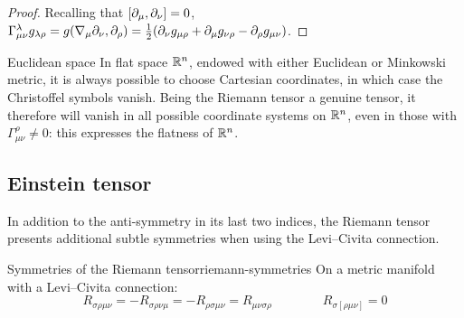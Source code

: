 \begin{proofbox}
  \begin{proof}
    Recalling that $ [\partial_\mu, \partial_\nu] = 0 $, $ \Gamma^\lambda_{\mu \nu} g_{\lambda \rho} = g(\nabla_\mu \partial_\nu, \partial_\rho) = \frac{1}{2} (\partial_\nu g_{\mu \rho} + \partial_\mu g_{\nu \rho} - \partial_\rho g_{\mu \nu}) $.
  \end{proof}
\end{proofbox}

\begin{example}{Euclidean space}{}
  In flat space $ \mathbb{R}^n $, endowed with either Euclidean or Minkowski metric, it is always possible to choose Cartesian coordinates, in which case the Christoffel symbols vanish. Being the Riemann tensor a genuine tensor, it therefore will vanish in all possible coordinate systems on $ \mathbb{R}^n $, even in those with $ \Gamma^\rho_{\mu \nu} \neq 0 $: this expresses the flatness of $ \mathbb{R}^n $.
\end{example}

\subsection{Einstein tensor}

In addition to the anti-symmetry in its last two indices, the Riemann tensor presents additional subtle symmetries when using the Levi--Civita connection.

\begin{proposition}{Symmetries of the Riemann tensor}{riemann-symmetries}
  On a metric manifold with a Levi--Civita connection:
  \begin{equation}
    R_{\sigma \rho \mu \nu} = - R_{\sigma \rho \nu \mu} = - R_{\rho \sigma \mu \nu} = R_{\mu \nu \sigma \rho}
    \qquad \qquad
    R_{\sigma [\rho \mu \nu]} = 0
    \label{eq:riemann-symm}
  \end{equation}
\end{proposition}

